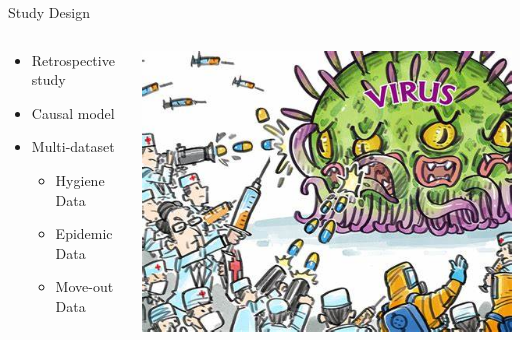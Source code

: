\documentclass[10pt,ignorenonframetext,aspectratio=169,notes=hide,]{beamer}
\providecommand{\tightlist}{%
  \setlength{\itemsep}{0pt}\setlength{\parskip}{0pt}}
\begin{document}
\begin{frame}{Study Design}
\protect\hypertarget{study-design}{}

\begin{columns}[T]
\begin{column}{0.48\textwidth}
\begin{itemize}
\item
  Retrospective study
\item
  Causal model
\item
  Multi-dataset

  \begin{itemize}
  \tightlist
  \item
    Hygiene Data
  \item
    Epidemic Data
  \item
    Move-out Data
  \end{itemize}
\end{itemize}
\end{column}

\begin{column}{0.48\textwidth}
\includegraphics[width=1\linewidth]{image/p3}
\end{column}
\end{columns}

\end{frame}
\end{document}
